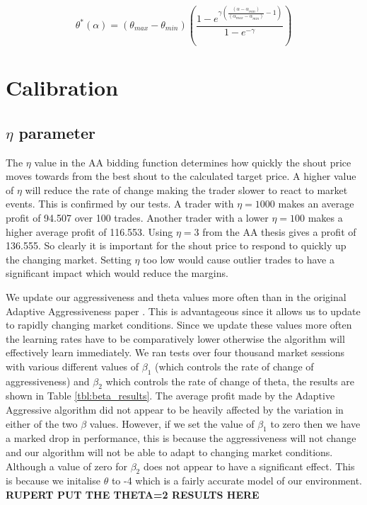 \documentclass[preprint]{acm_proc_article-sp} %
\begin{document}
\begin{equation}
  \theta^*(\alpha) = (\theta_{max}-\theta_{min})
  \left(\frac{1-e^{\gamma\left(\frac{(\alpha-\alpha_{min})}{(\alpha_{max}
  -\alpha_{min})}-1\right)}}{1-e^{-\gamma}}\right)
  \label{thetastar}
\end{equation}


\section{Calibration} \label{sec:calibration}
\subsection{$\eta$ parameter} \label{sec:calibration_eta}
The $\eta$ value in the AA bidding function determines how quickly the shout
price moves towards from the best shout to the calculated target price. A
higher value of $\eta$ will reduce the rate of change making the trader slower
to react to market events. This is confirmed by our tests. A trader with $\eta
= 1000$ makes an average profit of 94.507 over 100 trades. Another trader with
a lower $\eta = 100$ makes a higher average profit of 116.553. Using $\eta = 3$
from the AA thesis \cite{AA_thesis} gives a profit of 136.555. So clearly it is important for the
shout price to respond to quickly up the changing market. Setting $\eta$ too
low would cause outlier trades to have a significant impact which would reduce
the margins.

We update our aggressiveness and theta values more often than in the original
Adaptive Aggressiveness paper \cite{AA_thesis}. This is advantageous since it
allows us to update to rapidly changing market conditions. Since we update
these values more often the learning rates have to be comparatively lower
otherwise the algorithm will effectively learn immediately. We ran tests over
four thousand market sessions with various different values of $\beta_1$ (which
controls the rate of change of aggressiveness) and $\beta_2$ which controls the
rate of change of theta, the results are shown in Table \ref{tbl:beta_results}.
The average profit made by the Adaptive Aggressive algorithm did not appear to
be heavily affected by the variation in either of the two $\beta$ values.
However, if we set the value of $\beta_1$ to zero then we have a marked drop in
performance, this is because the aggressiveness will not change and our
algorithm will not be able to adapt to changing market conditions. Although a
value of zero for $\beta_2$ does not appear to have a significant effect. This
is because we initalise $\theta$ to -4 which is a fairly accurate model of our
environment. \textbf{RUPERT PUT THE THETA=2 RESULTS HERE}
\end{document}
